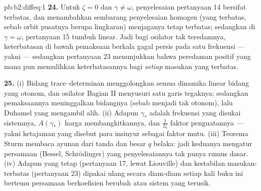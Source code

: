 \begin{solution}{pb:b2:diffeq:1}
\textbf{24.} Untuk $\zeta = 0$ dan $\gamma \neq \omega$,
penyelesaian pertanyaan 14 bersifat terbatas, dan menambahkan sembarang penyelesaian
homogen (yang terbatas, sebab orbit pusatnya berupa lingkaran) menjaganya tetap
terbatas; sedangkan di $\gamma = \omega$, pertanyaan 15 tumbuh linear. Jadi
bagi osilator tak teredamnya, keterbatasan di bawah pemaksaan
berkala gagal persis pada satu frekuensi --- yakni  ---
sedangkan pertanyaan 23 menunjukkan bahwa peredaman positif yang mana pun memulihkan
keterbatasannya bagi \emph{setiap} masukan yang terbatas.

\textbf{25.} (i) Bidang trace--determinan menggolongkan semua
dinamika linear bidang yang otonom, dan osilator Bagian II
menyusuri satu garis tegaknya; sedangkan pemaksaannya meninggalkan bidangnya
(sebab menjadi tak otonom), lalu Duhamel yang mengambil alih. (ii) Adapun $\gamma_*$ adalah
frekuensi yang disukai sistemnya, $A(\gamma_*)$ harga
membangkitkannya, dan $\frac{1}{2\zeta}$ faktor penguatannya
--- yakni ketajaman  yang disebut para insinyur sebagai faktor
mutu. (iii) Teorema Sturm membaca ayunan dari tanda
dan besar $q$ belaka: jadi keduanya mengatur persamaan (Bessel,
Schrödinger) yang penyelesaiannya tak punya rumus dasar.
(iv) Adapun  yang tetap (pertanyaan 17, lewat Liouville) dan
kestabilan masukan-terbatas (pertanyaan 23) dipakai ulang secara diam-diam
setiap kali buku ini bertemu persamaan berkoefisien berubah atau
sistem yang terusik.

\end{solution}
